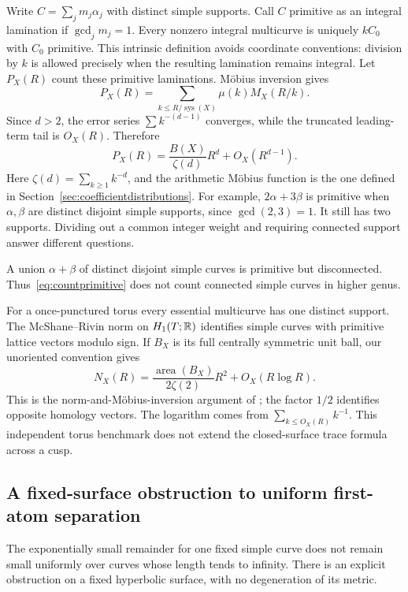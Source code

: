 Write $C=\sum_jm_j\alpha_j$ with distinct simple supports.  Call $C$
primitive as an integral lamination if $\gcd_jm_j=1$.
Every nonzero integral multicurve is uniquely $kC_0$ with $C_0$
primitive.  This intrinsic definition avoids coordinate conventions:
division by $k$ is allowed precisely when the resulting lamination
remains integral.  Let $P_X(R)$ count these primitive laminations.
M\"obius inversion gives
\[
 P_X(R)=\sum_{k\leq R/\operatorname{sys}(X)}\mu(k)M_X(R/k).
\]
Since $d>2$, the error series $\sum k^{-(d-1)}$ converges, while
the truncated leading-term tail is $O_X(R)$.  Therefore
\begin{equation}
 P_X(R)=\frac{B(X)}{\zeta(d)}R^d+O_X(R^{d-1}).
 \label{eq:countprimitive}
\end{equation}
Here $\zeta(d)=\sum_{k\ge1}k^{-d}$, and the arithmetic
M\"obius function is the one defined in Section~\ref{sec:coefficientdistributions}.
For example, $2\alpha+3\beta$ is primitive when $\alpha,\beta$
are distinct disjoint simple supports, since $\gcd(2,3)=1$.
It still has two supports. Dividing out a common integer weight
and requiring connected support answer different questions.

A union $\alpha+\beta$ of distinct disjoint simple curves is primitive
but disconnected.  Thus~\eqref{eq:countprimitive} does not count
connected simple curves in higher genus.

For a once-punctured torus every essential multicurve has one
distinct support.  The McShane--Rivin norm on $H_1(T;\mathbb R)$ identifies
simple curves with primitive lattice vectors modulo sign.  If $B_X$
is its full centrally symmetric unit ball, our unoriented convention
gives
\begin{equation}
 N_X(R)=\frac{\operatorname{area}(B_X)}{2\zeta(2)}R^2
                  +O_X(R\log R).
 \label{eq:counttorus}
\end{equation}
This is the norm-and-M\"obius-inversion argument of
\cite[Theorem 4.1]{McShaneRivinTori}; the factor $1/2$ identifies
opposite homology vectors.  The logarithm comes from
$\sum_{k\leq O_X(R)}k^{-1}$.  This independent torus benchmark does
not extend the closed-surface trace formula across a cusp.


\subsection{A fixed-surface obstruction to uniform first-atom separation}
\label{subsec:countnearcollision}

The exponentially small remainder for one fixed simple curve does not
remain small uniformly over curves whose length tends to infinity.
There is an explicit obstruction on a fixed hyperbolic surface, with
no degeneration of its metric.

